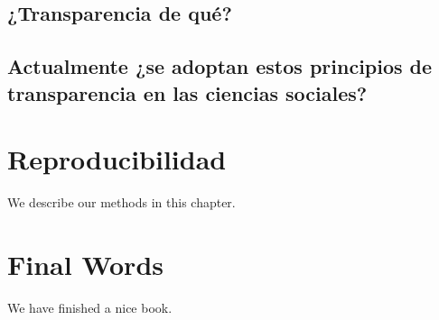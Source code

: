 \documentclass[
]{book}
\begin{document}
\hypertarget{transparencia-de-quuxe9}{%
\section{¿Transparencia de qué?}\label{transparencia-de-quuxe9}}

\hypertarget{actualmente-se-adoptan-estos-principios-de-transparencia-en-las-ciencias-sociales}{%
\section{Actualmente ¿se adoptan estos principios de transparencia en las ciencias sociales?}\label{actualmente-se-adoptan-estos-principios-de-transparencia-en-las-ciencias-sociales}}

\hypertarget{reproducibilidad}{%
\chapter{Reproducibilidad}\label{reproducibilidad}}

We describe our methods in this chapter.

\hypertarget{final-words}{%
\chapter{Final Words}\label{final-words}}

We have finished a nice book.

  
\end{document}
